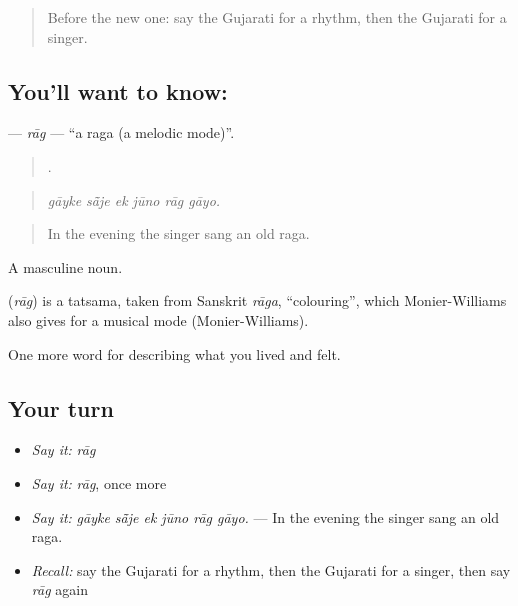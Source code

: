 \label{lesson:GU-C526-rag}



\begin{quote}
Before the new one: say the Gujarati for a rhythm, then the Gujarati for a singer.
\end{quote}

\subsection*{You'll want to know: }
\textbf{} — \emph{rāg} — \textquotedblleft{}a raga (a melodic mode)\textquotedblright{}.

\begin{quote}
     .
\end{quote}

\begin{quote}
\emph{gāyke sā̃je ek jūno rāg gāyo.}
\end{quote}

\begin{quote}
In the evening the singer sang an old raga.
\end{quote}

A masculine noun.

\begin{cousinweb}
\textbf{} (\emph{rāg}) is a tatsama, taken from Sanskrit \emph{rāga}, \textquotedblleft{}colouring\textquotedblright{}, which Monier-Williams also gives for a musical mode (Monier-Williams).
\end{cousinweb}

\begin{grammarlens}[title={What you've built}]
One more word for describing what you lived and felt.
\end{grammarlens}

\subsection*{Your turn}
\begin{itemize}
\raggedright
  \item \emph{Say it:} \emph{rāg}
  \item \emph{Say it:} \emph{rāg}, once more
  \item \emph{Say it:} \emph{gāyke sā̃je ek jūno rāg gāyo.} — In the evening the singer sang an old raga.
  \item \emph{Recall:} say the Gujarati for a rhythm, then the Gujarati for a singer, then say \emph{rāg} again
\end{itemize}

